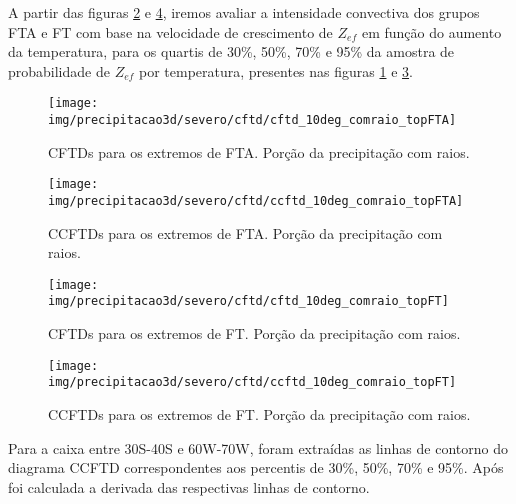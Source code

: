 
A partir das figuras \ref{ccftd_fta_com} e \ref{ccftd_ft_com}, iremos avaliar a intensidade convectiva dos grupos FTA e FT com base na velocidade de crescimento de $Z_{ef}$ em função do aumento da temperatura, para os quartis de 30\%, 50\%, 70\% e 95\% da amostra de probabilidade de $Z_{ef}$ por temperatura, presentes nas figuras \ref{cftd_fta_com} e \ref{cftd_ft_com}.

\begin{figure}[!ht]
  \centering
  \texttt{[image: img/precipitacao3d/severo/cftd/cftd\_10deg\_comraio\_topFTA]}
 \caption{CFTDs para os extremos de FTA. Porção da precipitação com raios.}
 \label{cftd_fta_com}
\end{figure} 

\begin{figure}[!ht]
  \centering
  \texttt{[image: img/precipitacao3d/severo/cftd/ccftd\_10deg\_comraio\_topFTA]}
  \caption{CCFTDs para os extremos de FTA. Porção da precipitação com raios.}
  \label{ccftd_fta_com}   
\end{figure} 

 

\begin{figure}[!ht]
  \centering
  \texttt{[image: img/precipitacao3d/severo/cftd/cftd\_10deg\_comraio\_topFT]}
 \caption{CFTDs para os extremos de FT. Porção da precipitação com raios.}
 \label{cftd_ft_com}
\end{figure} 

\begin{figure}[!ht]
  \centering
  \texttt{[image: img/precipitacao3d/severo/cftd/ccftd\_10deg\_comraio\_topFT]}
  \caption{CCFTDs para os extremos de FT. Porção da precipitação com raios.}
  \label{ccftd_ft_com}   
\end{figure} 

Para a caixa entre 30S-40S e 60W-70W, foram extraídas as linhas de contorno do diagrama CCFTD correspondentes aos percentis de 30\%, 50\%, 70\% e 95\%. Após foi calculada a derivada das respectivas linhas de contorno.

